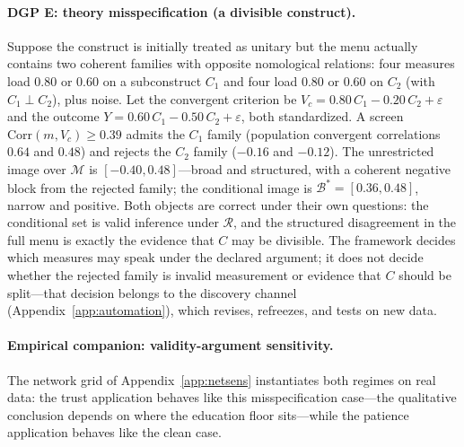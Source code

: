 \documentclass[10pt,letterpaper]{article}
\newcommand{\M}{\ensuremath{\mathcal{M}}}
\newcommand{\Rset}{\mathcal{R}}
\newcommand{\Bset}{\mathcal{B}}
\begin{document}
\paragraph{DGP E: theory misspecification (a divisible construct).}
Suppose the construct is initially treated as unitary but the menu actually contains two coherent families with opposite nomological relations: four measures load $0.80$ or $0.60$ on a subconstruct $C_1$ and four load $0.80$ or $0.60$ on $C_2$ (with $C_1\perp C_2$), plus noise.
Let the convergent criterion be $V_c=0.80\,C_1-0.20\,C_2+\varepsilon$ and the outcome $Y=0.60\,C_1-0.50\,C_2+\varepsilon$, both standardized.
A screen $\mathrm{Corr}(m,V_c)\ge 0.39$ admits the $C_1$ family (population convergent correlations $0.64$ and $0.48$) and rejects the $C_2$ family ($-0.16$ and $-0.12$).
The unrestricted image over $\M$ is $[-0.40,0.48]$---broad and structured, with a coherent negative block from the rejected family; the conditional image is $\Bset^*=[0.36,0.48]$, narrow and positive.
Both objects are correct under their own questions: the conditional set is valid inference under $\Rset$, and the structured disagreement in the full menu is exactly the evidence that $C$ may be divisible.
The framework decides which measures may speak under the declared argument; it does not decide whether the rejected family is invalid measurement or evidence that $C$ should be split---that decision belongs to the discovery channel (Appendix~\ref{app:automation}), which revises, refreezes, and tests on new data.

\paragraph{Empirical companion: validity-argument sensitivity.}
The network grid of Appendix~\ref{app:netsens} instantiates both regimes on real data: the trust application behaves like this misspecification case---the qualitative conclusion depends on where the education floor sits---while the patience application behaves like the clean case.
\end{document}
